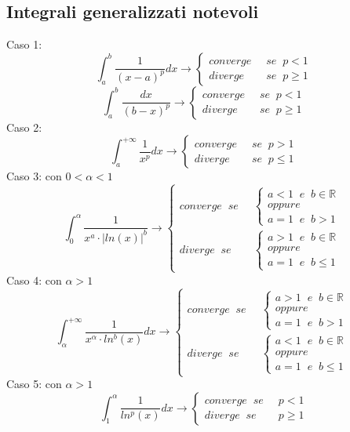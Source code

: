 \documentclass[a4paper, 9pt]{report}
\begin{document}
\subsection*{Integrali generalizzati notevoli}
Caso 1:
\[
    \int_{a}^{b}\frac{1}{(x-a)^p}dx \rightarrow \begin{cases}
        converge \;\;&se \;\;p<1\\
        diverge \;\;&se \;\; p\geq 1
    \end{cases}
\]
\[
    \int_{a}^{b}\frac{dx}{(b-x)^p} \rightarrow  \begin{cases}
        converge \;\;&se \;\;p<1\\
        diverge \;\;&se \;\; p\geq 1
    \end{cases}
\]
Caso 2:
\[
    \int_{a}^{+\infty}\frac{1}{x^p}dx \rightarrow \begin{cases}
        converge \;\; & se \;\; p > 1\\
        diverge \;\; &  se \;\; p \leq 1
    \end{cases}
\]
Caso 3: con $0< \alpha < 1$
\[
    \int_{0}^{\alpha} \frac{1}{x^a \cdot  |ln(x)|^b} \rightarrow \begin{cases}
        converge \;\; se \;\; & \begin{cases}
            a < 1 \;\; e \;\; b \in \mathbb{R}\\
            oppure \\
            a=1 \;\; e \;\; b > 1
        \end{cases}\\
        diverge \;\; se \;\; & \begin{cases}
            a>1 \;\; e \;\; b \in \mathbb{R}\\
            oppure\\
            a=1 \;\; e \;\; b \leq 1
        \end{cases}
    \end{cases}
\]
Caso 4: con $\alpha > 1$
\[
    \int_{\alpha}^{+\infty} \frac{1}{x^\alpha \cdot ln^b(x)}dx \rightarrow \begin{cases}
        converge \;\; se \;\; & \begin{cases}
            a > 1 \;\; e \;\; b \in \mathbb{R}\\
            oppure \\
            a=1 \;\; e \;\; b > 1
        \end{cases}\\
        diverge \;\; se \;\; & \begin{cases}
            a<1 \;\; e \;\; b \in \mathbb{R}\\
            oppure\\
            a=1 \;\; e \;\; b \leq 1
        \end{cases}
    \end{cases}
\]
Caso 5: con $\alpha> 1$
\[
    \int_{1}^{\alpha}\frac{1}{ln^p(x)} dx \rightarrow \begin{cases}
        converge \;\; se \;\; &p<1\\
        diverge \;\; se \;\; &p\geq 1
    \end{cases}
\]
\end{document}
